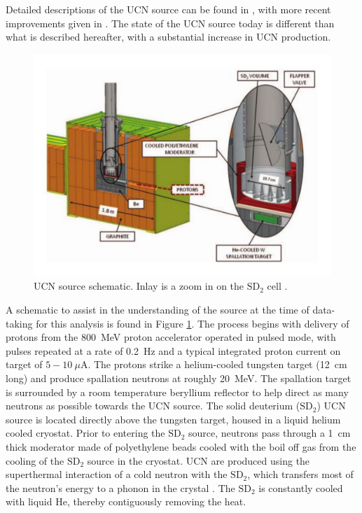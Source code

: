 Detailed descriptions of the UCN source can be found in
\cite{saunders2004demonstration,morris2002measurements,saunders2013performance}, with
more recent improvements given in \cite{ito2017performance}. The state of the
UCN source today is different than what is described hereafter, with a substantial
increase in UCN production.

\begin{figure}[h]
  \centering
  \includegraphics[scale=0.48]{2-UCNAExperiment/source_figure.pdf} 
  \caption{UCN source schematic. Inlay is a zoom in on the
    $\mathrm{SD}_2$ cell \cite{saunders2013performance}.}
  \label{fig:sourceFig}
\end{figure}

A schematic to assist in the understanding of the source at the time of data-taking
for this analysis is found in Figure
\ref{fig:sourceFig}. The process begins with delivery of protons from the 800~MeV proton
accelerator operated in pulsed mode, with pulses repeated at a rate of 0.2~Hz and a typical
integrated proton current on target of $5-10~\mu$A.
The protons strike a helium-cooled tungsten target (12~cm long) and produce
spallation neutrons at roughly 20~MeV. The spallation target is surrounded by
a room temperature beryllium reflector to help direct as many neutrons as
possible towards the UCN source. The solid deuterium ($\mathrm{SD}_2$) UCN source
is located directly above the tungsten target, housed in a liquid helium
cooled cryostat. Prior to entering the $\mathrm{SD}_2$ source, neutrons
pass through a 1~cm thick moderator made of polyethylene beads cooled with the boil off gas
from the cooling of the $\mathrm{SD}_2$ source in the cryostat.
UCN are produced using the superthermal interaction of a cold neutron with the $\mathrm{SD}_2$,
which transfers most of the neutron's energy to a phonon in the crystal \cite{golub1991ultra}.
The $\mathrm{SD}_2$ is constantly cooled with liquid He, thereby contiguously removing
the heat. 

